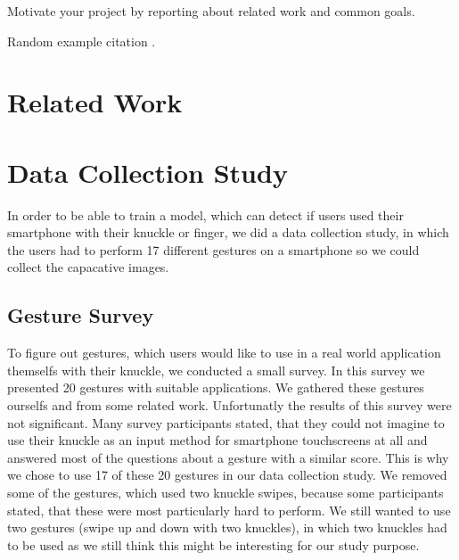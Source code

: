\documentclass[sigchi-a, authorversion]{acmart}
\begin{document}
Motivate your project by reporting about related work and common goals.

Random example citation \cite{Le:2018:PalmTouch}.
\section{Related Work}

\section{Data Collection Study}
In order to be able to train a model, which can detect if users used their smartphone with their knuckle or finger, we did a data collection study, in which the users had to perform 17 different gestures on a smartphone so we could collect the capacative images.

\subsection{Gesture Survey}
To figure out gestures, which users would like to use in a real world application themselfs with their knuckle, we conducted a small survey.
In this survey we presented 20 gestures with suitable applications.
We gathered these gestures ourselfs and from some related work. %
Unfortunatly the results of this survey were not significant.
Many survey participants stated, that they could not imagine to use their knuckle as an input method for smartphone touchscreens at all and answered most of the questions about a gesture with a similar score.
This is why we chose to use 17 of these 20 gestures in our data collection study.
We removed some of the gestures, which used two knuckle swipes, because some participants stated, that these were most particularly hard to perform.
We still wanted to use two gestures (swipe up and down with two knuckles), in which two knuckles had to be used as we still think this might be interesting for our study purpose. 
\end{document}
